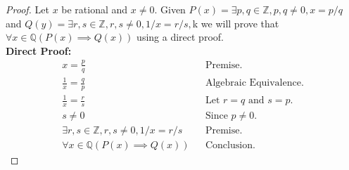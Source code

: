 \documentclass{article}
\newcommand{\AllIntegers}{\mathbb{Z}}
\newcommand{\AllRationals}{\mathbb{Q}}
\begin{document}
\begin{proof}
    Let \(x\) be rational and \(x \neq 0\). Given \(P(x) = \exists p,q \in \AllIntegers, p,q \neq 0, x = p/q\) and \(Q(y) = \exists r,s \in \AllIntegers, r,s \neq 0,  1/x = r/s,\)k we will prove that \(\forall x \in \AllRationals(P(x)\implies Q(x))\) using a direct proof.\\
    \textbf{Direct Proof:}
    \begin{align*}
        x = \frac{p}{q}&&\text{Premise.}\\
        \frac{1}{x} = \frac{q}{p}&&\text{Algebraic Equivalence.}\\
        \frac{1}{x} = \frac{r}{s}&&\text{Let } r = q \text{ and } s = p.\\
        s \neq 0&&\text{Since } p \neq 0.\\
        \exists r,s \in \AllIntegers, r,s \neq 0,  1/x = r/s&&\text{Premise.}\\
        \forall x \in \AllRationals(P(x)\implies Q(x))&&\text{Conclusion.}
    \end{align*}
\end{proof}
\end{document}
